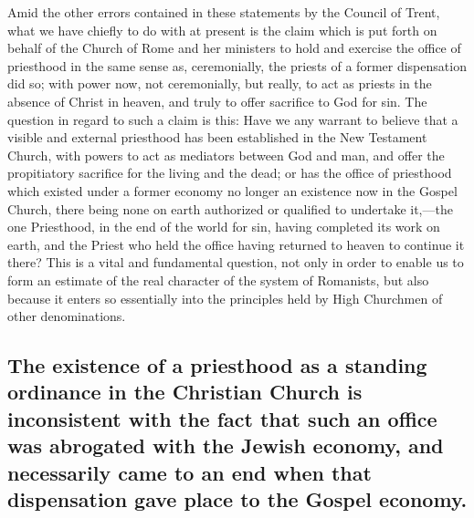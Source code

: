 \documentclass[]{book}
\begin{document}
Amid the other errors contained in these statements by the Council of Trent, what we have chiefly to do with at present is the claim which is put forth on behalf of the Church of Rome and her ministers to hold and exercise the office of priesthood in the same sense as, ceremonially, the priests of a former dispensation did so; with power now, not ceremonially, but really, to act as priests in the absence of Christ in heaven, and truly to offer sacrifice to God for sin. The question in regard to such a claim is this: Have we any warrant to believe that a visible and external priesthood has been established in the New Testament Church, with powers to act as mediators between God and man, and offer the propitiatory sacrifice for the living and the dead; or has the office of priesthood which existed under a former economy no longer an existence now in the Gospel Church, there being none on earth authorized or qualified to undertake it,---the one Priesthood, in the end of the world for sin, having completed its work on earth, and the Priest who held the office having returned to heaven to continue it there? This is a vital and fundamental question, not only in order to enable us to form an estimate of the real character of the system of Romanists, but also because it enters so essentially into the principles held by High Churchmen of other denominations.

\hypertarget{the-existence-of-a-priesthood-as-a-standing-ordinance-in-the-christian-church-is-inconsistent-with-the-fact-that-such-an-office-was-abrogated-with-the-jewish-economy-and-necessarily-came-to-an-end-when-that-dispensation-gave-place-to-the-gospel-economy.}{%
\subsection{The existence of a priesthood as a standing ordinance in the Christian Church is inconsistent with the fact that such an office was abrogated with the Jewish economy, and necessarily came to an end when that dispensation gave place to the Gospel economy.}\label{the-existence-of-a-priesthood-as-a-standing-ordinance-in-the-christian-church-is-inconsistent-with-the-fact-that-such-an-office-was-abrogated-with-the-jewish-economy-and-necessarily-came-to-an-end-when-that-dispensation-gave-place-to-the-gospel-economy.}}
\end{document}
